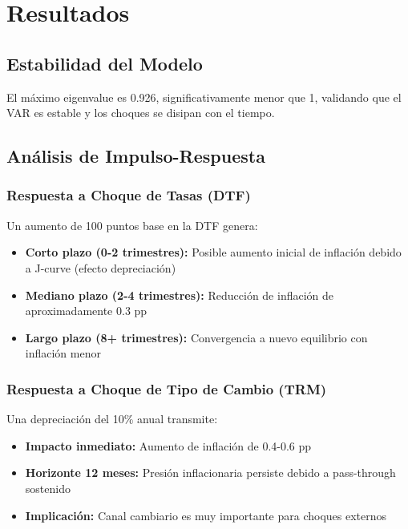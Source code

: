 \documentclass[12pt,a4paper]{article}
\begin{document}
\section{Resultados}
\label{sec:resultados}

\subsection{Estabilidad del Modelo}

El máximo eigenvalue es 0.926, significativamente menor que 1, validando que el VAR es estable y los choques se disipan con el tiempo.

\subsection{Análisis de Impulso-Respuesta}

\subsubsection{Respuesta a Choque de Tasas (DTF)}

Un aumento de 100 puntos base en la DTF genera:
\begin{itemize}
\item \textbf{Corto plazo (0-2 trimestres):} Posible aumento inicial de inflación debido a J-curve (efecto depreciación)
\item \textbf{Mediano plazo (2-4 trimestres):} Reducción de inflación de aproximadamente 0.3 pp
\item \textbf{Largo plazo (8+ trimestres):} Convergencia a nuevo equilibrio con inflación menor
\end{itemize}

\subsubsection{Respuesta a Choque de Tipo de Cambio (TRM)}

Una depreciación del 10\% anual transmite:
\begin{itemize}
\item \textbf{Impacto inmediato:} Aumento de inflación de 0.4-0.6 pp
\item \textbf{Horizonte 12 meses:} Presión inflacionaria persiste debido a pass-through sostenido
\item \textbf{Implicación:} Canal cambiario es muy importante para choques externos
\end{itemize}
\end{document}
